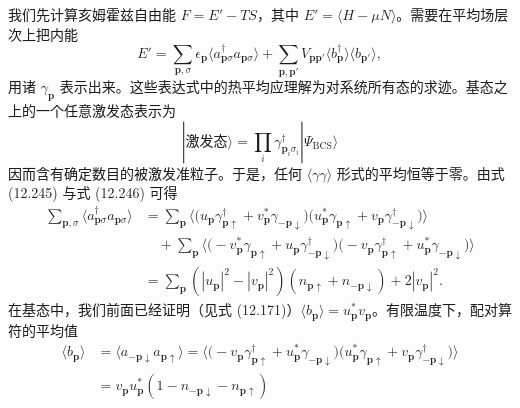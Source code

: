 我们先计算亥姆霍兹自由能 $F=E'-TS$，其中 $E'=\langle H-\mu N\rangle$。需要在平均场层次上把内能
\begin{equation*}
E'=\sum_{\mathbf{p},\sigma}\epsilon_{\mathbf{p}}\langle a_{\mathbf{p}\sigma}^{\dagger}a_{\mathbf{p}\sigma}\rangle+\sum_{\mathbf{p},\mathbf{p}'}V_{\mathbf{p}\mathbf{p}'}\langle b_{\mathbf{p}}^{\dagger}\rangle\langle b_{\mathbf{p}'}\rangle,\tag{12.249}
\end{equation*}
用诸 $\gamma_{\mathbf{p}}$ 表示出来。这些表达式中的热平均应理解为对系统所有态的求迹。基态之上的一个任意激发态表示为
\begin{equation*}
|\text{激发态}\rangle=\prod_{i}\gamma_{\mathbf{p}_{i}\sigma_{i}}^{\dagger}|\Psi_{\mathrm{BCS}}\rangle\tag{12.250}
\end{equation*}
因而含有确定数目的被激发准粒子。于是，任何 $\langle\gamma\gamma\rangle$ 形式的平均恒等于零。由式 (12.245) 与式 (12.246) 可得
\begin{align*}
\sum_{\mathbf{p},\sigma}\langle a_{\mathbf{p}\sigma}^{\dagger}a_{\mathbf{p}\sigma}\rangle&=\sum_{\mathbf{p}}\Big\langle\big(u_{\mathbf{p}}\gamma_{\mathbf{p}\uparrow}^{\dagger}+v_{\mathbf{p}}^{*}\gamma_{-\mathbf{p}\downarrow}\big)\big(u_{\mathbf{p}}^{*}\gamma_{\mathbf{p}\uparrow}+v_{\mathbf{p}}\gamma_{-\mathbf{p}\downarrow}^{\dagger}\big)\Big\rangle\\
&\quad+\sum_{\mathbf{p}}\Big\langle\big(-v_{\mathbf{p}}^{*}\gamma_{\mathbf{p}\uparrow}+u_{\mathbf{p}}\gamma_{-\mathbf{p}\downarrow}^{\dagger}\big)\big(-v_{\mathbf{p}}\gamma_{\mathbf{p}\uparrow}^{\dagger}+u_{\mathbf{p}}^{*}\gamma_{-\mathbf{p}\downarrow}\big)\Big\rangle\\
&=\sum_{\mathbf{p}}\left(\left|u_{\mathbf{p}}\right|^{2}-\left|v_{\mathbf{p}}\right|^{2}\right)\left(n_{\mathbf{p}\uparrow}+n_{-\mathbf{p}\downarrow}\right)+2\left|v_{\mathbf{p}}\right|^{2}.\tag{12.251}
\end{align*}
在基态中，我们前面已经证明（见式 (12.171)）$\langle b_{\mathbf{p}}\rangle=u_{\mathbf{p}}^{*}v_{\mathbf{p}}$。有限温度下，配对算符的平均值
\begin{align*}
\langle b_{\mathbf{p}}\rangle&=\langle a_{-\mathbf{p}\downarrow}a_{\mathbf{p}\uparrow}\rangle=\Big\langle\big(-v_{\mathbf{p}}\gamma_{\mathbf{p}\uparrow}^{\dagger}+u_{\mathbf{p}}^{*}\gamma_{-\mathbf{p}\downarrow}\big)\big(u_{\mathbf{p}}^{*}\gamma_{\mathbf{p}\uparrow}+v_{\mathbf{p}}\gamma_{-\mathbf{p}\downarrow}^{\dagger}\big)\Big\rangle\\
&=v_{\mathbf{p}}u_{\mathbf{p}}^{*}\left(1-n_{-\mathbf{p}\downarrow}-n_{\mathbf{p}\uparrow}\right)\tag{12.252}
\end{align*}

